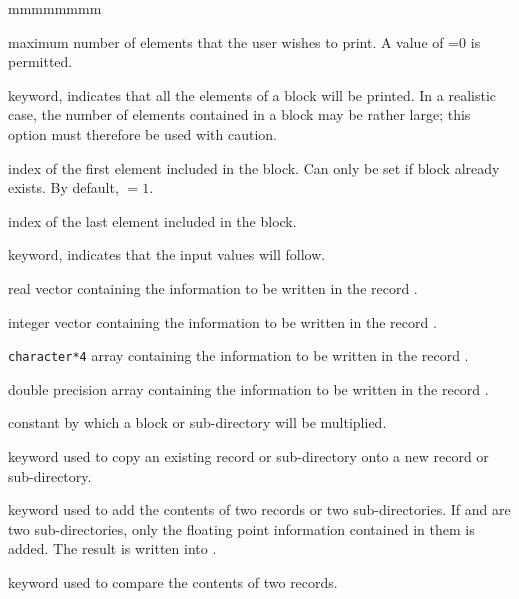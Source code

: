 \begin{ListeDeDescription}{mmmmmmmm}
\item[\dusa{ileni}] maximum number of elements that the user wishes to print.
A value of =0 is permitted.

\item[\moc{*}] keyword, indicates that all the elements of a block will be
printed. In a realistic case, the number of elements contained in a block may be
rather large; this option must therefore be used with caution.

\item[\dusa{ilenc1}] index of the first element included in the block. Can only be set if block
 already exists. By default,  $=1$.

\item[\dusa{ilenc2}] index of the last element included in the block.

\item[\moc{=}] keyword, indicates that the input values will follow.

\item[\dusa{valc}] real vector containing the information to be written in
the record .

\item[\dusa{ivalc}] integer vector containing the information to be written in
the record .

\item[\dusa{hvalc}] {\tt character*4} array containing the information to be
written in the record .

\item[\dusa{dvalc}] double precision array containing the information to be
written in the record .

\item[\dusa{flott}] constant by which a block or sub-directory will be
multiplied.

\item[\moc{COPY}] keyword used to copy an existing record or sub-directory
onto a new record or sub-directory.

\item[\moc{ADD}] keyword used to add the contents of two records or two
sub-directories. If  and  are two
sub-directories, only the floating point information contained in them is added.
The result is written into .

\item[\moc{STAT}] keyword used to compare the contents of two records.


\end{ListeDeDescription}
